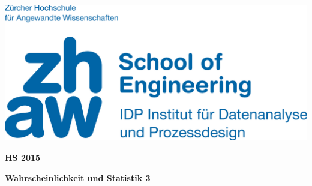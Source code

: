 \noindent
\begin{minipage}[t]{0.4\textwidth} 
\includegraphics[width=\linewidth]{logo.jpg}
\end{minipage}%
\hfill%
\begin{minipage}[t]{0.4\textwidth}\raggedleft
\textbf{\large HS 2015}
\end{minipage}

\begin{center}
 \textbf{\large Wahrscheinlichkeit und Statistik 3} \\
 \vspace{0.3cm}
\end{center}
